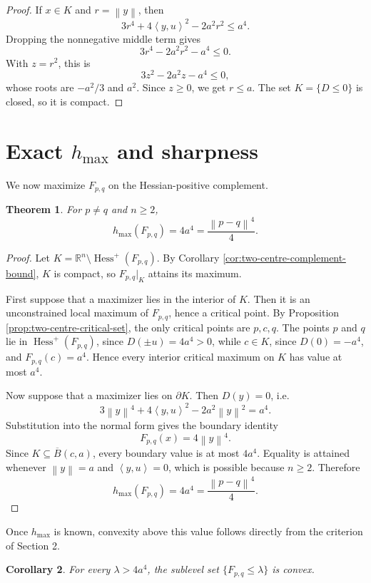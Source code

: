 \documentclass[11pt]{amsart}
\newtheorem{theorem}{Theorem}[section]
\newtheorem{corollary}[theorem]{Corollary}
\theoremstyle{remark}
\newcommand{\Hessp}{\operatorname{Hess}^{+}}
\newcommand{\R}{\mathbb{R}}
\newcommand{\ip}[2]{\left\langle #1,#2\right\rangle}
\newcommand{\norm}[1]{\left\lVert #1\right\rVert}
\begin{document}
\begin{proof}
If $x\in K$ and $r=\norm{y}$, then
\[
 3r^4+4\ip{y}{u}^2-2a^2r^2\le a^4.
\]
Dropping the nonnegative middle term gives
\[
 3r^4-2a^2r^2-a^4\le0.
\]
With $z=r^2$, this is
\[
 3z^2-2a^2z-a^4\le0,
\]
whose roots are $-a^2/3$ and $a^2$. Since $z\ge0$, we get $r\le a$. The set
$K=\{D\le0\}$ is closed, so it is compact.
\end{proof}

\section{Exact \texorpdfstring{$h_{\max}$}{hmax} and sharpness}

We now maximize \(F_{p,q}\) on the Hessian-positive complement.

\begin{theorem}\label{thm:two-centre-hmax}
For $p\ne q$ and $n\ge2$,
\[
 h_{\max}(F_{p,q})=4a^4=\frac{\norm{p-q}^4}{4}.
\]
\end{theorem}

\begin{proof}
Let $K=\R^n\setminus\Hessp(F_{p,q})$. By Corollary
\ref{cor:two-centre-complement-bound}, $K$ is compact, so $F_{p,q}|_K$
attains its maximum.

First suppose that a maximizer lies in the interior of $K$. Then it is an
unconstrained local maximum of $F_{p,q}$, hence a critical point. By
Proposition \ref{prop:two-centre-critical-set}, the only critical points are
$p,c,q$. The points $p$ and $q$ lie in $\Hessp(F_{p,q})$, since
$D(\pm u)=4a^4>0$, while $c\in K$, since $D(0)=-a^4$, and
$F_{p,q}(c)=a^4$. Hence every interior critical maximum on $K$ has value at
most $a^4$.

Now suppose that a maximizer lies on $\partial K$. Then $D(y)=0$, i.e.
\[
 3\norm{y}^4+4\ip{y}{u}^2-2a^2\norm{y}^2=a^4.
\]
Substitution into the normal form gives the boundary identity
\[
 F_{p,q}(x)=4\norm{y}^4.
\]
Since $K\subseteq\overline B(c,a)$, every boundary value is at most $4a^4$.
Equality is attained whenever $\norm{y}=a$ and $\ip{y}{u}=0$, which is possible
because $n\ge2$. Therefore
\[
 h_{\max}(F_{p,q})=4a^4=\frac{\norm{p-q}^4}{4}.
\]
\end{proof}

Once \(h_{\max}\) is known, convexity above this value follows directly from
the criterion of Section 2.

\begin{corollary}\label{cor:two-centre-high-sublevels-convex}
For every $\lambda>4a^4$, the sublevel set $\{F_{p,q}\le\lambda\}$ is convex.
\end{corollary}
\end{document}
